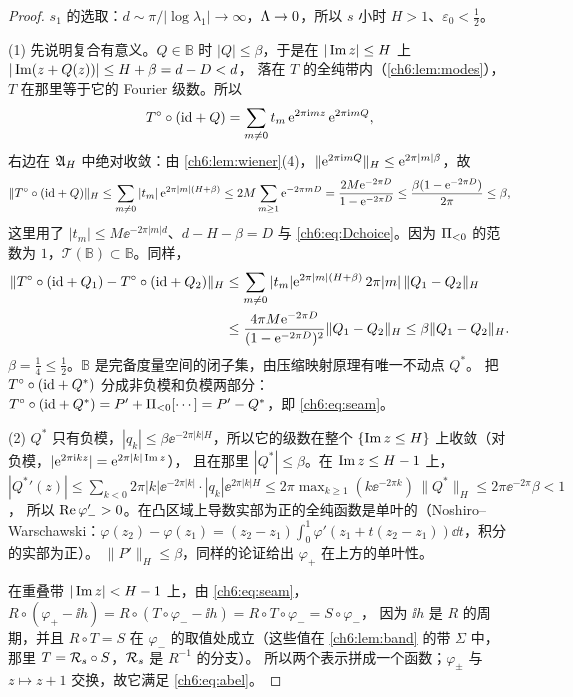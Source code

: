 \begin{proof}
$s_1$ 的选取：$d\sim\pi/|\log\lambda_1|\to\infty$，$\Lambda\to0$，所以 $s$ 小时 $H>1$、$\varepsilon_0<\tfrac12$。

(1) 先说明复合有意义。$Q\in\mathbb B$ 时 $|Q|\le\beta$，于是在 $|\operatorname{Im} z|\le H$ 上 $|\operatorname{Im}(z+Q(z))|\le H+\beta=d-D<d$，
落在 $T$ 的全纯带内（\cref{ch6:lem:modes}），$T$ 在那里等于它的 Fourier 级数。所以
\[
 T^{\circ}\circ(\mathrm{id}+Q)=\sum_{m\ne0}t_m\,\mathrm{e}^{2\pi\mathrm{i} mz}\,\mathrm{e}^{2\pi\mathrm{i} mQ},
\]
右边在 $\mathfrak A_H$ 中绝对收敛：由 \cref{ch6:lem:wiener}(4)，$\|\mathrm{e}^{2\pi\mathrm{i} mQ}\|_H\le\mathrm{e}^{2\pi|m|\beta}$，故
\[
 \|T^{\circ}\circ(\mathrm{id}+Q)\|_H\le\sum_{m\ne0}|t_m|\,\mathrm{e}^{2\pi|m|(H+\beta)}\le2M\sum_{m\ge1}\mathrm{e}^{-2\pi mD}=\frac{2M\mathrm{e}^{-2\pi D}}{1-\mathrm{e}^{-2\pi D}}
 \le\frac{\beta(1-\mathrm{e}^{-2\pi D})}{2\pi}\le\beta ,
\]
这里用了 $|t_m|\le M\ee^{-2\pi|m|d}$、$d-H-\beta=D$ 与 \eqref{ch6:eq:Dchoice}。因为 $\Pi_{<0}$ 的范数为 $1$，$\mathcal T(\mathbb B)\subset\mathbb B$。同样，
\[
 \begin{aligned}
 \|T^{\circ}\circ(\mathrm{id}+Q_1)-T^{\circ}\circ(\mathrm{id}+Q_2)\|_H&\le\sum_{m\ne0}|t_m|\mathrm{e}^{2\pi|m|(H+\beta)}\,2\pi|m|\,\|Q_1-Q_2\|_H\\
 &\le\frac{4\pi M\mathrm{e}^{-2\pi D}}{(1-\mathrm{e}^{-2\pi D})^2}\|Q_1-Q_2\|_H\le\beta\|Q_1-Q_2\|_H .
 \end{aligned}
\]
$\beta=\tfrac14\le\tfrac12$。$\mathbb B$ 是完备度量空间的闭子集，由压缩映射原理有唯一不动点 $Q^*$。
把 $T^{\circ}\circ(\mathrm{id}+Q^*)$ 分成非负模和负模两部分：$T^{\circ}\circ(\mathrm{id}+Q^*)=P'+\Pi_{<0}[\cdots]=P'-Q^*$，即 \eqref{ch6:eq:seam}。

(2) $Q^*$ 只有负模，$|q_k|\le\beta\ee^{-2\pi|k|H}$，所以它的级数在整个 $\{\operatorname{Im} z\le H\}$ 上收敛（对负模，$|\mathrm{e}^{2\pi\mathrm{i} kz}|=\mathrm{e}^{2\pi|k|\operatorname{Im} z}$），
且在那里 $|Q^*|\le\beta$。在 $\operatorname{Im} z\le H-1$ 上，
$|{Q^*}'(z)|\le\sum_{k<0}2\pi|k|\ee^{-2\pi|k|}\cdot|q_k|\ee^{2\pi|k|H}\le2\pi\max_{k\ge1}(k\ee^{-2\pi k})\,\|Q^*\|_H\le2\pi\ee^{-2\pi}\beta<1$，
所以 $\operatorname{Re}\varphi_-'>0$。在凸区域上导数实部为正的全纯函数是单叶的（Noshiro--Warschawski：$\varphi(z_2)-\varphi(z_1)=(z_2-z_1)\int_0^1\varphi'(z_1+t(z_2-z_1))\dd t$，积分的实部为正）。
$\|P'\|_H\le\beta$，同样的论证给出 $\varphi_+$ 在上方的单叶性。

在重叠带 $|\operatorname{Im} z|<H-1$ 上，由 \eqref{ch6:eq:seam}，
$R\circ(\varphi_+-\ii h)=R\circ(T\circ\varphi_--\ii h)=R\circ T\circ\varphi_-=S\circ\varphi_-$，
因为 $\ii h$ 是 $R$ 的周期，并且 $R\circ T=S$ 在 $\varphi_-$ 的取值处成立（这些值在 \cref{ch6:lem:band} 的带 $\Sigma$ 中，那里 $T=\mathcal R_s\circ S$，$\mathcal R_s$ 是 $R^{-1}$ 的分支）。
所以两个表示拼成一个函数；$\varphi_\pm$ 与 $z\mapsto z+1$ 交换，故它满足 \eqref{ch6:eq:abel}。


\end{proof}
